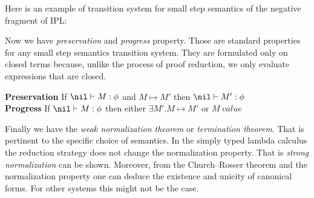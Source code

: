  Here is an example of  transition system for small step semantics of the negative fragment of \ac{IPL}:
 \begin{mdframed}
 \end{mdframed}

Now we have \emph{preservation} and \emph{progress} property. Those are standard properties for any small step semantics transition system. They are formulated
only on closed terms because, unlike the process of proof reduction, we
only evaluate expressions that are closed.

\begin{mdframed}
\textbf{Preservation}
If $\nil\vdash M:\phi$ and $ M\mapsto M'$ then $\nil\vdash M':\phi$ \\
\textbf{Progress}
If $\nil\vdash M:\phi$ then either $\exists M'. M\mapsto M'$ or $M \ value$
\end{mdframed}

Finally we have the  \emph{weak normalization theorem} or \emph{termination theorem}. That is pertinent to the specific choice of semantics. In the simply typed lambda calculus the reduction strategy does not change the normalization property. That is \emph{strong normalization} can be shown. Moreover, from the Church--Rosser theorem and the normalization property one can deduce the existence and unicity of canonical forms.  For other systems this might not be the case.

